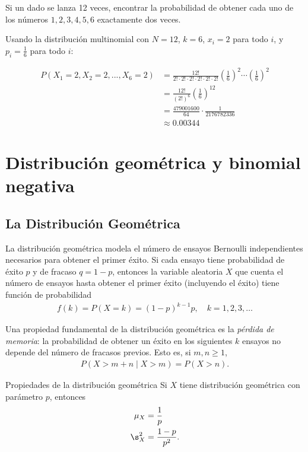  \begin{ejemplo}
  \label{exmp:2.10.6}
Si un dado se lanza 12 veces, encontrar la probabilidad de obtener cada uno de los números $1,2,3,4,5,6$ exactamente dos veces.
 \end{ejemplo}

\begin{solucion}
	Usando la distribución multinomial con $N=12$, $k=6$, $x_i = 2$ para todo $i$, y $p_i = \frac{1}{6}$ para todo $i$:

	\begin{align}
		P(X_1=2, X_2=2, ..., X_6=2) &= \frac{12!}{2! \cdot 2! \cdot 2! \cdot 2! \cdot 2! \cdot 2!} \left(\frac{1}{6}\right)^2 \cdots \left(\frac{1}{6}\right)^2 \\
		&= \frac{12!}{(2!)^6} \left(\frac{1}{6}\right)^{12} \\
		&= \frac{479001600}{64} \cdot \frac{1}{2176782336} \\
		&\approx 0.00344
	\end{align}
\end{solucion}


\section{Distribución geométrica y binomial negativa}
\subsection{La Distribución Geométrica}

La distribución geométrica modela el número de ensayos Bernoulli independientes necesarios para obtener el primer éxito. Si cada ensayo tiene probabilidad de éxito $p$ y de fracaso $q=1-p$, entonces la variable aleatoria $X$ que cuenta el número de ensayos hasta obtener el primer éxito (incluyendo el éxito) tiene función de probabilidad
\begin{align}
 \label{eq:2.10.9}
 f(k) = P(X=k) = (1-p)^{k-1}p, \quad k=1,2,3,\dots
\end{align}

Una propiedad fundamental de la distribución geométrica es la \emph{pérdida de memoria}: la probabilidad de obtener un éxito en los siguientes $k$ ensayos no depende del número de fracasos previos. Esto es, si $m,n\geq 1$,
\begin{align}
 P(X > m+n \mid X > m) = P(X > n).
\end{align}

{Propiedades de la distribución geométrica} Si $X$ tiene distribución geométrica con parámetro $p$, entonces
\begin{align}
 \mu_{X} &= \dfrac{1}{p} \\
 \s_{X}^{2} &= \dfrac{1-p}{p^{2}}.
\end{align}

